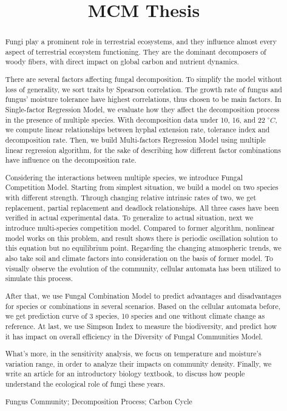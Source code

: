\documentclass{mcmthesis}
\title{MCM Thesis}
\begin{document}
\begin{abstract}
  
  Fungi play a prominent role in terrestrial ecosystems, and they influence almost every aspect of terrestrial ecosystem functioning. They are the dominant decomposers of woody fibers, with direct impact on global carbon and nutrient dynamics.

  There are several factors affecting fungal decomposition. To simplify the model without loss of generality, we sort traits by Spearson correlation. The growth rate of fungus and fungus' moisture tolerance have highest correlations, thus chosen to be main factors. In Single-factor Regression Model, we evaluate how they affect the decomposition process in the presence of multiple species. With decomposition data under 10, 16, and 22 $^\circ C$, we compute linear relationships between hyphal extension rate, tolerance index and decomposition rate. Then, we build Multi-factors Regression Model using multiple linear regression algorithm, for the sake of describing how different factor combinations have influence on the decomposition rate. 
  
  Considering the interactions between multiple species, we introduce Fungal Competition Model. Starting from simplest situation, we build a model on two species with different strength. Through changing relative intrinsic rates of two, we get replacement, partial replacement and deadlock relationships. All three cases have been verified in actual experimental data. To generalize to actual situation, next we introduce multi-species competition model. Compared to former algorithm, nonlinear model works on this problem, and result shows there is periodic oscillation solution to this equation but no equilibrium point. Regarding the changing atmospheric trends, we also take soil and climate factors into consideration on the basis of former model. To visually observe the evolution of the community, cellular automata has been utilized to simulate this process.
  
  After that, we use Fungal Combination Model to predict advantages and disadvantages for species or combinations in several scenarios. Based on the cellular automata before, we get prediction curve of 3 species, 10 species and one without climate change as reference. At last, we use Simpson Index to measure the biodiversity, and predict how it has impact on overall efficiency in the Diversity of Fungal Communities Model.
  
  What's more, in the sensitivity analysis, we focus on temperature and moisture's variation range, in order to analyze their impacts on community density. Finally, we write an article for an introductory biology textbook, to discuss how people understand the ecological role of fungi these years. 

\begin{keywords}
  Fungus Community; Decomposition Process; Carbon Cycle
\end{keywords}
\end{abstract}
\end{document}
